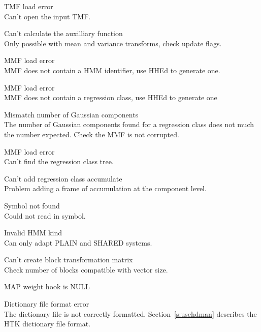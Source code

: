 \begin{itemize}
\begin{itemize}
\end{itemize}


\begin{itemize}

 TMF load error\\
        Can't open the input TMF.

 Can't calculate the auxilliary function\\
        Only possible with mean and variance transforms, check update flags.

 MMF load error\\
        MMF does not contain a HMM identifier, use HHEd to generate
        one.

 MMF load error\\
        MMF does not contain a regression class, use HHEd to generate
        one
  
 Mismatch number of Gaussian components \\
        The number of Gaussian components found for a regression class
        does not much the number expected. Check the MMF is not corrupted.

 MMF load error\\
        Can't find the regression class tree.

 Can't add regression class accumulate\\
        Problem adding a frame of accumulation at the component level.

 Symbol not found\\
        Could not read in symbol.

 Invalid HMM kind\\
        Can only adapt PLAIN and SHARED systems.

 Can't create block transformation matrix\\
        Check number of blocks compatible with vector size.

 MAP weight hook is NULL\\

\end{itemize}


\begin{itemize}
    Dictionary file format error\\
        The dictionary file is not correctly formatted.  
        Section~\ref{s:usehdman} describes the HTK dictionary file format.


\end{itemize}
\end{itemize}
